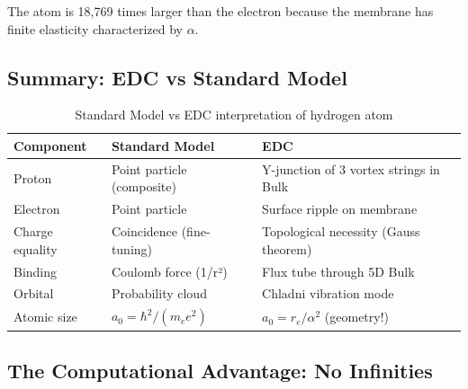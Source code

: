 The atom is 18,769 times larger than the electron because the membrane has finite elasticity characterized by $\alpha$.

\subsection{Summary: EDC vs Standard Model}
\label{subsec:comparison}

\begin{table}[h]
\centering
\begin{tabular}{|l|l|l|}
\hline
\textbf{Component} & \textbf{Standard Model} & \textbf{EDC} \\
\hline
Proton & Point particle (composite) & Y-junction of 3 vortex strings in Bulk \\
Electron & Point particle & Surface ripple on membrane \\
Charge equality & Coincidence (fine-tuning) & Topological necessity (Gauss theorem) \\
Binding & Coulomb force (1/r²) & Flux tube through 5D Bulk \\
Orbital & Probability cloud & Chladni vibration mode \\
Atomic size & $a_0 = \hbar^2/(m_e e^2)$ & $a_0 = r_e/\alpha^2$ (geometry!) \\
\hline
\end{tabular}
\caption{Standard Model vs EDC interpretation of hydrogen atom}
\label{tab:comparison}
\end{table}

\subsection{The Computational Advantage: No Infinities}
\label{subsec:computational}

